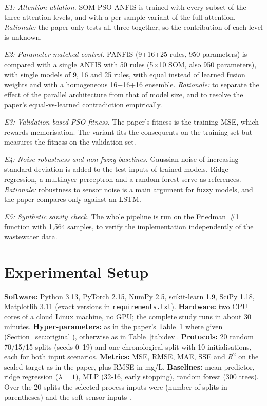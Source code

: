 \documentclass[conference]{IEEEtran}
\newcommand{\Rsq}{$R^2$}
\begin{document}
\emph{E1: Attention ablation.} SOM-PSO-ANFIS is trained with every subset of the three attention levels, and with a per-sample variant of the full attention. \emph{Rationale:} the paper only tests all three together, so the contribution of each level is unknown.

\emph{E2: Parameter-matched control.} PANFIS (9+16+25 rules, 950 parameters) is compared with a single ANFIS with 50 rules (5$\times$10 SOM, also 950 parameters), with single models of 9, 16 and 25 rules, with equal instead of learned fusion weights and with a homogeneous 16+16+16 ensemble. \emph{Rationale:} to separate the effect of the parallel architecture from that of model size, and to resolve the paper's equal-vs-learned contradiction empirically.

\emph{E3: Validation-based PSO fitness.} The paper's fitness is the training MSE, which rewards memorisation. The variant fits the consequents on the training set but measures the fitness on the validation set.

\emph{E4: Noise robustness and non-fuzzy baselines.} Gaussian noise of increasing standard deviation is added to the test inputs of trained models. Ridge regression, a multilayer perceptron and a random forest serve as references. \emph{Rationale:} robustness to sensor noise is a main argument for fuzzy models, and the paper compares only against an LSTM.

\emph{E5: Synthetic sanity check.} The whole pipeline is run on the Friedman~\#1 function with 1,564 samples, to verify the implementation independently of the wastewater data.

\section{Experimental Setup}
\textbf{Software:} Python 3.13, PyTorch 2.15, NumPy 2.5, scikit-learn 1.9, SciPy 1.18, Matplotlib 3.11 (exact versions in \texttt{requirements.txt}). \textbf{Hardware:} two CPU cores of a cloud Linux machine, no GPU; the complete study runs in about 30 minutes. \textbf{Hyper-parameters:} as in the paper's Table~1 where given (Section~\ref{sec:original}), otherwise as in Table~\ref{tab:dev}. \textbf{Protocols:} 20 random 70/15/15 splits (seeds 0--19) and one chronological split with 10 initialisations, each for both input scenarios. \textbf{Metrics:} MSE, RMSE, MAE, SSE and \Rsq{} on the scaled target as in the paper, plus RMSE in mg/L. \textbf{Baselines:} mean predictor, ridge regression ($\lambda=1$), MLP (32-16, early stopping), random forest (300 trees). Over the 20 splits the selected process inputs were \factfeaturesproc{} (number of splits in parentheses) and the soft-sensor inputs \factfeaturessoft{}.
\end{document}
